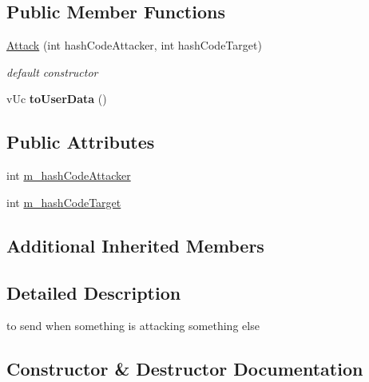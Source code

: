 \subsection*{Public Member Functions}
\begin{DoxyCompactItemize}
\item 
\hyperlink{class_network_1_1_messages_1_1_attack_aca5ab57565286b39fed7ffa22d144f86}{Attack} (int hash\+Code\+Attacker, int hash\+Code\+Target)
\begin{DoxyCompactList}\small\item\em default constructor \end{DoxyCompactList}\item 
\mbox{\label{class_network_1_1_messages_1_1_attack_a4fd2a044e17620909f7677fb02f97658}} 
v\+Uc {\bfseries to\+User\+Data} ()
\end{DoxyCompactItemize}
\subsection*{Public Attributes}
\begin{DoxyCompactItemize}
\item 
int \hyperlink{class_network_1_1_messages_1_1_attack_ad4192a40cbd42a24bef08ce05cefe55f}{m\+\_\+hash\+Code\+Attacker}
\item 
int \hyperlink{class_network_1_1_messages_1_1_attack_a7647036525ed4ca8df6b6f3652c00065}{m\+\_\+hash\+Code\+Target}
\end{DoxyCompactItemize}
\subsection*{Additional Inherited Members}


\subsection{Detailed Description}
to send when something is attacking something else 

\subsection{Constructor \& Destructor Documentation}
\mbox{\label{class_network_1_1_messages_1_1_attack_aca5ab57565286b39fed7ffa22d144f86}} 
